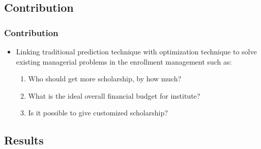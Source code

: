 \documentclass{beamer}
\begin{document}
\subsection{Contribution}

\begin{frame}
    \frametitle{Contribution}
    \begin{itemize}
    \item Linking traditional prediction technique with optimization 
    technique to solve existing managerial problems  in the enrollment
    management such as:
    \begin{enumerate}
    \item Who should get more scholarship, by how much?
    \item What is the ideal overall financial budget for institute?
    \item Is it possible to give customized scholarship?
    \end{enumerate}
    
    \end{itemize}
  
\end{frame}

\subsection{Results}
\end{document}
